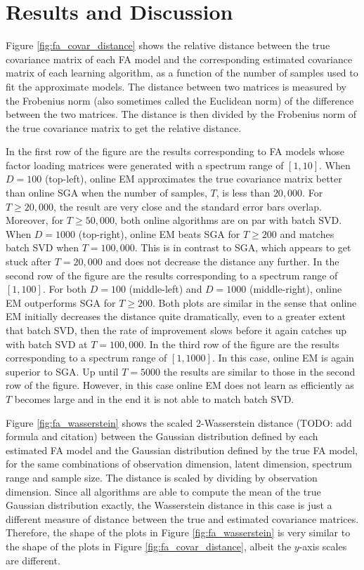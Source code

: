 \documentclass[msc,deptreport.inf]{infthesis} %
\begin{document}
\section{Results and Discussion}

Figure \ref{fig:fa_covar_distance} shows the relative distance between the true covariance matrix of each FA model and the corresponding estimated covariance matrix of each learning algorithm, as a function of the number of samples used to fit the approximate models. The distance between two matrices is measured by the Frobenius norm (also sometimes called the Euclidean norm) of the difference between the two matrices. The distance is then divided by the Frobenius norm of the true covariance matrix to get the relative distance. 

In the first row of the figure are the results corresponding to FA models whose factor loading matrices were generated with a spectrum range of $[1, 10]$. When $D=100$ (top-left), online EM approximates the true covariance matrix better than online SGA when the number of samples, $T$, is less than $20,000$. For $T \geq 20,000$, the result are very close and the standard error bars overlap. Moreover, for $T \geq 50,000$, both online algorithms are on par with batch SVD. When $D=1000$ (top-right), online EM beats SGA for $T \geq 200$ and matches batch SVD when $T=100,000$. This is in contrast to SGA, which appears to get stuck after $T=20,000$ and does not decrease the distance any further. In the second row of the figure are the results corresponding to a spectrum range of $[1, 100]$. For both $D=100$ (middle-left) and $D=1000$ (middle-right), online EM outperforms SGA for $T \geq 200$. Both plots are similar in the sense that online EM initially decreases the distance quite dramatically, even to a greater extent that batch SVD, then the rate of improvement slows before it again catches up with batch SVD at $T=100,000$. In the third row of the figure are the results corresponding to a spectrum range of $[1, 1000]$. In this case, online EM is again superior to SGA. Up until $T=5000$ the results are similar to those in the second row of the figure. However, in this case online EM does not learn as efficiently as $T$ becomes large and in the end it is not able to match batch SVD.

Figure \ref{fig:fa_wasserstein} shows the scaled 2-Wasserstein distance (TODO: add formula and citation) between the Gaussian distribution defined by each estimated FA model and the Gaussian distribution defined by the true FA model, for the same combinations of observation dimension, latent dimension, spectrum range and sample size. The distance is scaled by dividing by observation dimension. Since all algorithms are able to compute the mean of the true Gaussian distribution exactly, the Wasserstein distance in this case is just a different measure of distance between the true and estimated covariance matrices. Therefore, the shape of the plots in Figure \ref{fig:fa_wasserstein} is very similar to the shape of the plots in Figure \ref{fig:fa_covar_distance}, albeit the $y$-axis scales are different. 
\end{document}
